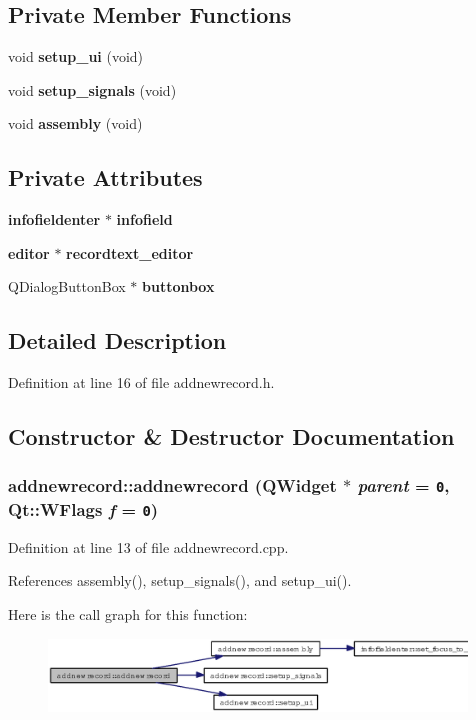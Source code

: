 \subsection*{Private Member Functions}
\begin{CompactItemize}
\item 
void {\bf setup\_\-ui} (void)
\item 
void {\bf setup\_\-signals} (void)
\item 
void {\bf assembly} (void)
\end{CompactItemize}
\subsection*{Private Attributes}
\begin{CompactItemize}
\item 
{\bf infofieldenter} $\ast$ {\bf infofield}
\item 
{\bf editor} $\ast$ {\bf recordtext\_\-editor}
\item 
QDialog\-Button\-Box $\ast$ {\bf buttonbox}
\end{CompactItemize}


\subsection{Detailed Description}




Definition at line 16 of file addnewrecord.h.

\subsection{Constructor \& Destructor Documentation}
\subsubsection{\setlength{\rightskip}{0pt plus 5cm}addnewrecord::addnewrecord (QWidget $\ast$ {\em parent} = {\tt 0}, Qt::WFlags {\em f} = {\tt 0})}\label{classaddnewrecord_729e13e04194b13db2db349baa0c83b4}




Definition at line 13 of file addnewrecord.cpp.

References assembly(), setup\_\-signals(), and setup\_\-ui().

Here is the call graph for this function:\begin{figure}[H]
\begin{center}
\leavevmode
\includegraphics[width=315pt]{classaddnewrecord_729e13e04194b13db2db349baa0c83b4_cgraph}
\end{center}
\end{figure}
